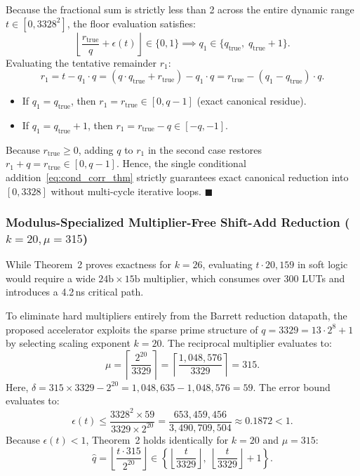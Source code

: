 Because the fractional sum is strictly less than 2 across the entire dynamic range $t \in [0, 3328^2]$, the floor evaluation satisfies:
\begin{equation}
\label{eq:floor_result}
\left\lfloor \frac{r_{\text{true}}}{q} + \epsilon(t) \right\rfloor \in \{0, 1\} \implies q_1 \in \{ q_{\text{true}}, \; q_{\text{true}} + 1 \}.
\end{equation}
Evaluating the tentative remainder $r_1$:
\begin{equation}
\label{eq:r1_expansion}
r_1 = t - q_1 \cdot q = (q \cdot q_{\text{true}} + r_{\text{true}}) - q_1 \cdot q = r_{\text{true}} - (q_1 - q_{\text{true}}) \cdot q.
\end{equation}
\begin{itemize}
    \item If $q_1 = q_{\text{true}}$, then $r_1 = r_{\text{true}} \in [0, q-1]$ (exact canonical residue).
    \item If $q_1 = q_{\text{true}} + 1$, then $r_1 = r_{\text{true}} - q \in [-q, -1]$.
\end{itemize}
Because $r_{\text{true}} \ge 0$, adding $q$ to $r_1$ in the second case restores $r_1 + q = r_{\text{true}} \in [0, q-1]$. Hence, the single conditional addition~\eqref{eq:cond_corr_thm} strictly guarantees exact canonical reduction into $[0, 3328]$ without multi-cycle iterative loops. \hfill $\blacksquare$

\subsubsection{Modulus-Specialized Multiplier-Free Shift-Add Reduction (\texorpdfstring{$k=20, \mu=315$}{k=20, mu=315})}
While Theorem~2 proves exactness for $k = 26$, evaluating $t \cdot 20,159$ in soft logic would require a wide $24\text{b} \times 15\text{b}$ multiplier, which consumes over 300 LUTs and introduces a 4.2\,ns critical path.

To eliminate hard multipliers entirely from the Barrett reduction datapath, the proposed accelerator exploits the sparse prime structure of $q = 3329 = 13 \cdot 2^8 + 1$ by selecting scaling exponent $k = 20$. The reciprocal multiplier evaluates to:
\begin{equation}
\label{eq:mu_k20}
\mu = \left\lceil \frac{2^{20}}{3329} \right\rceil = \left\lceil \frac{1,048,576}{3329} \right\rceil = 315.
\end{equation}
Here, $\delta = 315 \times 3329 - 2^{20} = 1,048,635 - 1,048,576 = 59$. The error bound evaluates to:
\begin{equation}
\label{eq:epsilon_k20}
\epsilon(t) \le \frac{3328^2 \times 59}{3329 \times 2^{20}} = \frac{653,459,456}{3,490,709,504} \approx 0.1872 < 1.
\end{equation}
Because $\epsilon(t) < 1$, Theorem~2 holds identically for $k = 20$ and $\mu = 315$:
\begin{equation}
\label{eq:qhat_k20_bounds}
\hat{q} = \left\lfloor \frac{t \cdot 315}{2^{20}} \right\rfloor \in \left\{ \left\lfloor \frac{t}{3329} \right\rfloor, \; \left\lfloor \frac{t}{3329} \right\rfloor + 1 \right\}.
\end{equation}

